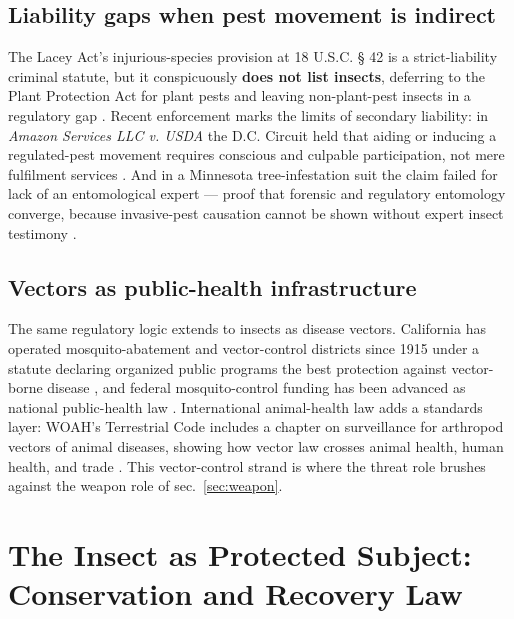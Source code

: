 \documentclass[
  english,
]{article}
\begin{document}
\subsection{Liability gaps when pest movement is
indirect}\label{liability-gaps-when-pest-movement-is-indirect}

The Lacey Act's injurious-species provision at 18 U.S.C. § 42 is a
strict-liability criminal statute, but it conspicuously \textbf{does not
list insects}, deferring to the Plant Protection Act for plant pests and
leaving non-plant-pest insects in a regulatory gap
\citep{lacey42, crs_lacey}. Recent enforcement marks the limits of
secondary liability: in \emph{Amazon Services LLC v. USDA} the D.C.
Circuit held that aiding or inducing a regulated-pest movement requires
conscious and culpable participation, not mere fulfilment services
\citep{amazon2024}. And in a Minnesota tree-infestation suit the claim
failed for lack of an entomological expert --- proof that forensic and
regulatory entomology converge, because invasive-pest causation cannot
be shown without expert insect testimony \citep{minnlawyer_lac}.

\subsection{Vectors as public-health
infrastructure}\label{vectors-as-public-health-infrastructure}

The same regulatory logic extends to insects as disease vectors.
California has operated mosquito-abatement and vector-control districts
since 1915 under a statute declaring organized public programs the best
protection against vector-borne disease \citep{ca_vector_hsc2001}, and
federal mosquito-control funding has been advanced as national
public-health law \citep{asthovector}. International animal-health law
adds a standards layer: WOAH's Terrestrial Code includes a chapter on
surveillance for arthropod vectors of animal diseases, showing how
vector law crosses animal health, human health, and trade
\citep{woah_vector_surveillance}. This vector-control strand is where
the threat role brushes against the weapon role of
sec.~\ref{sec:weapon}.

\newpage

\section{The Insect as Protected Subject: Conservation and Recovery
Law}\label{sec:protected}
\end{document}
